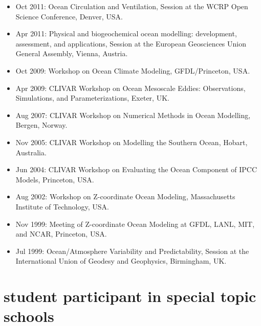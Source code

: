 \documentclass{article}
\begin{document}
\begin{itemize}[leftmargin=*]
\item Oct 2011: {\sc Ocean Circulation and Ventilation}, Session at
the WCRP Open Science Conference, Denver, USA. 

\item Apr 2011: {\sc Physical and biogeochemical ocean modelling:
  development, assessment, and applications}, Session at the European
Geosciences Union General Assembly, Vienna, Austria.

\item Oct 2009: {\sc Workshop on Ocean Climate Modeling},
  GFDL/Princeton, USA.

 \item Apr 2009: {\sc CLIVAR Workshop on Ocean Mesoscale Eddies:
    Observations, Simulations, and Parameterizations}, Exeter, UK.

\item Aug 2007: {\sc CLIVAR Workshop on Numerical Methods in Ocean
  Modelling}, Bergen, Norway.

\item Nov 2005: {\sc CLIVAR Workshop on Modelling the Southern
  Ocean}, Hobart, Australia.

\item Jun 2004: {\sc CLIVAR Workshop on Evaluating the Ocean
  Component of IPCC Models}, Princeton, USA.

\item Aug 2002: {\sc Workshop on Z-coordinate Ocean Modeling},
Massachusetts Institute of Technology, USA.

\item Nov 1999: {\sc Meeting of Z-coordinate Ocean Modeling at GFDL,
  LANL, MIT, and NCAR}, Princeton, USA.

\item Jul 1999: {\sc Ocean/Atmosphere Variability and
  Predictability}, Session at the International Union of Geodesy and
Geophysics, Birmingham, UK.

\end{itemize}


\section*{\sc \color{Maroon}  student participant in special topic schools}
\vspace{-.3cm}
\end{document}

